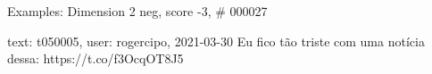 \begin{frame}{Examples: Dimension 2 neg, score -3, \# 000027}
\footnotesize
\begin{alertblock}{text: t050005, user: rogercipo, 2021-03-30}
Eu fico tão triste com uma notícia dessa:  
    
 \textbf{} 
 https://t.co/f3OcqOT8J5 
\end{alertblock}
\end{frame}
